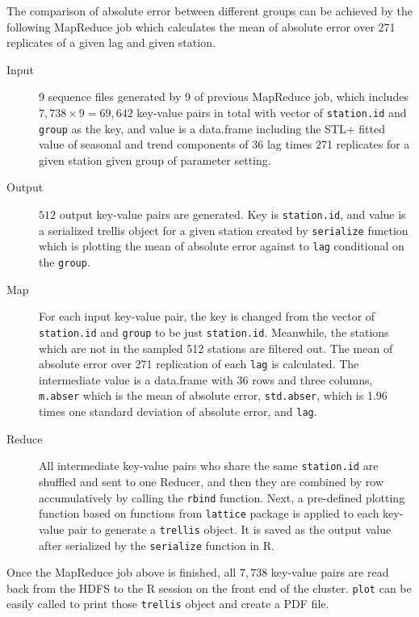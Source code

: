 The comparison of absolute
error between different groups can be achieved by the following MapReduce job
which calculates the mean of absolute error over 271 replicates of a given lag
and given station.

\begin{description}
  \item[Input] 9 sequence files generated by 9 of previous MapReduce job, which 
  includes $7,738 \times 9 = 69,642$ key-value pairs in total with vector of 
  \texttt{station.id} and \texttt{group} as the key, and value is a data.frame 
  including the STL+ fitted value of seasonal and trend components of 36 lag 
  times 271 replicates for a given station given group of parameter setting.
  \item[Output] $512$ output key-value pairs are generated. Key is 
  \texttt{station.id}, and value is a serialized trellis object for a given 
  station created by \texttt{serialize} function which is plotting the mean of 
  absolute error against to \texttt{lag} conditional on the \texttt{group}.
  \item[Map] For each input key-value pair, the key is changed from the vector 
  of \texttt{station.id} and \texttt{group} to be just \texttt{station.id}. 
  Meanwhile, the stations which are not in the sampled 512 stations are filtered
  out. The mean of absolute error over 271 replication of each \texttt{lag} is 
  calculated. The intermediate value is a data.frame with 36 rows and three 
  columns, \texttt{m.abser} which is the mean of absolute error, 
  \texttt{std.abser}, which is 1.96 times one standard deviation of absolute
  error, and \texttt{lag}.
  \item[Reduce] All intermediate key-value pairs who share the same 
  \texttt{station.id} are shuffled and sent to one Reducer, and then they are 
  combined by row accumulatively by calling the \texttt{rbind} function. Next,
  a pre-defined plotting function based on functions from \texttt{lattice} 
  package is applied to each key-value pair to generate a \texttt{trellis} object.
  It is saved as the output value after serialized by the \texttt{serialize}
  function in R.
\end{description} 

Once the MapReduce job above is finished, all $7,738$ key-value pairs are read
back from the HDFS to the R session on the front end of the cluster. \texttt{plot}
can be easily called to print those \texttt{trellis} object and create a PDF file.


